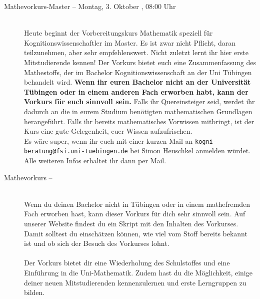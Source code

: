\begin{description}


\ifkogwiss
    \ifmaster
        \item[Mathevorkurs-Master -- Montag, 3. Oktober \YEAR, 08:00 Uhr]\ \\
        Heute beginnt der Vorbereitungskurs Mathematik speziell für Kognitionswissenschaftler im Master. Es ist zwar nicht Pflicht, daran teilzunehmen, aber sehr empfehlenswert. Nicht zuletzt lernt ihr hier erste Mitstudierende kennen! Der Vorkurs bietet euch eine Zusammenfassung des Mathestoffs, der im Bachelor Kognitionswissenschaft an der Uni Tübingen behandelt wird.
        \textbf{Wenn ihr euren Bachelor nicht an der Universität Tübingen oder in einem anderen Fach erworben habt, kann der Vorkurs für euch sinnvoll sein.} Falls ihr Quereinsteiger seid, werdet ihr dadurch an die in eurem Studium benötigten mathematischen Grundlagen herangeführt. Falls ihr bereits mathematisches Vorwissen mitbringt, ist der Kurs eine gute Gelegenheit, euer Wissen aufzufrischen.\\
         Es wäre super, wenn ihr euch mit einer kurzen Mail an \texttt{kogni-beratung@fsi.uni-tuebingen.de} bei Simon Heuschkel anmelden würdet. Alle weiteren Infos erhaltet ihr dann per Mail.

%
%
    \fi
\fi

\ifmaster
	\ifml %
	\else
		\ifkogwiss %
		\else
			\item[Mathevorkurs -- \mathedatum~\YEAR]~\\
			Wenn du deinen Bachelor nicht in Tübingen oder in einem mathefremden Fach erworben hast, kann dieser Vorkurs für dich sehr sinnvoll sein. Auf unserer Website findest du ein Skript mit den Inhalten des Vorkurses. Damit solltest du einschätzen können, wie viel vom Stoff bereits bekannt ist und ob sich der Besuch des Vorkurses lohnt.\\\\
			Der Vorkurs bietet dir eine Wiederholung des Schulstoffes und eine Einführung in die Uni-Mathematik. Zudem hast du die Möglichkeit, einige deiner neuen Mitstudierenden kennenzulernen und erste Lerngruppen zu bilden.


\end{description}
